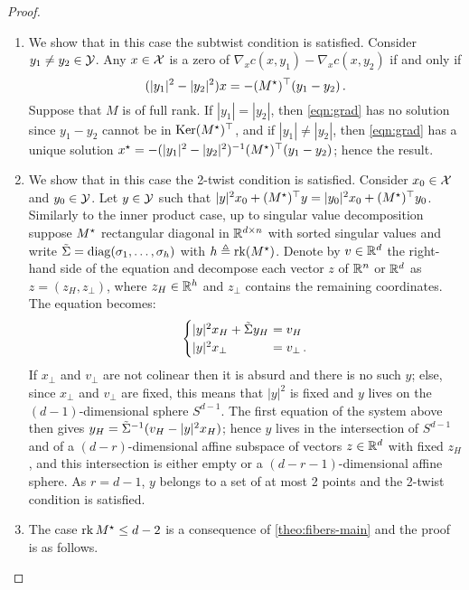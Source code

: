             \begin{proof}\
            \begin{enumerate}[label=(\roman*)]
                \item We show that in this case the subtwist condition is satisfied. Consider $y_1\neq y_2\in\mathcal{Y}$. Any $x\in\mathcal{X}$ is a zero of $\nabla_x c(x,y_1)-\nabla_x c(x,y_2)$ if and only if
                    \begin{equation}
                        (|y_1|^2-|y_2|^2)x=-(M^\star)^\top(y_1-y_2)\,.
                        \label{eqn:grad}
                    \end{equation}
                    Suppose that $M$ is of full rank. If $|y_1|=|y_2|$, then \cref{eqn:grad} has no solution since $y_1-y_2$ cannot be in $\operatorname{Ker}(M^\star)^\top$, and if $|y_1|\neq|y_2|$, then \cref{eqn:grad} has a unique solution $x^\star=-(|y_1|^2-|y_2|^2)^{-1}(M^\star)^\top(y_1-y_2)$; hence the result.
                \item We show that in this case the 2-twist condition is satisfied. Consider $x_0\in\mathcal{X}$ and $y_0\in\mathcal{Y}$. Let $y\in\mathcal{Y}$ such that $|y|^{2}x_{0}+(M^\star)^\top y=|y_{0}|^{2}x_{0}+(M^\star)^\top y_{0}$. Similarly to the inner product case, up to singular value decomposition suppose $M^\star$ rectangular diagonal in $\mathbb{R}^{d\times n}$ with sorted singular values and write $\tilde {\Sigma} =\operatorname*{diag}(\sigma_{1},\dots,\sigma_{h})$ with $h \triangleq \operatorname*{rk}(M^\star)$. Denote by $v\in\mathbb{R}^d$ the right-hand side of the equation and decompose each vector $z$ of $\mathbb{R}^n$ or $\mathbb{R}^d$ as $z=(z_H,z_\perp)$, where $z_H\in\mathbb{R}^h$ and $z_\perp$ contains the remaining coordinates. The equation becomes: $$\begin{cases}
                |y|^{2}x_H+\tilde\Si y_H & \!\!\!\!=v_H \\
                |y|^{2}x_{\perp} & \!\!\!\!=v_{\perp} \,.
                \end{cases}$$
                If $x_\perp$ and $v_\perp$ are not colinear then it is absurd and there is no such $y$; else, since $x_{\perp}$ and $v_{\perp}$ are fixed, this means that $|y|^{2}$ is fixed and $y$ lives on the $(d-1)$-dimensional sphere $S^{d-1}$. The first equation of the system above then gives $y_H=\tilde{\Sigma}^{-1}(v_H-|y|^{2}x_H)$; hence $y$ lives in the intersection of $S^{d-1}$ and of a $(d-r)$-dimensional affine subspace of vectors $z\in\mathbb{R}^d$ with fixed $z_H$, and this intersection is either empty or a $(d-r-1)$-dimensional affine sphere. As $r=d-1$, $y$ belongs to a set of at most 2 points and the 2-twist condition is satisfied.
            \item The case $\operatorname*{rk} M^\star\leq d-2$ is a consequence of \cref{theo:fibers-main} and the proof is as follows.

\end{enumerate}
\end{proof}
